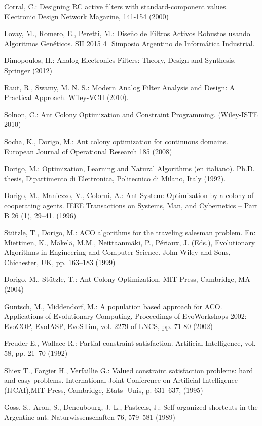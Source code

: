 \documentclass{llncs}
\begin{document}
  \begin{thebibliography}{1}
      Corral, C.: 
      Designing RC active filters with standard-component values. Electronic Design
      Network Magazine, 141-154 (2000)
      
      Lovay, M., Romero, E., Peretti, M.:
      Diseño de Filtros Activos Robustos usando Algoritmos Genéticos.
      SII 2015 4$^\circ$ Simposio Argentino de Informática Industrial.
      
      Dimopoulos, H.: 
      Analog Electronics Filters: Theory, Design and Synthesis. 
      Springer (2012)
      
      Raut, R., Swamy, M. N. S.: 
      Modern Analog Filter Analysis and Design: A Practical Approach. 
      Wiley-VCH (2010).
      
      Solnon, C.:
      Ant Colony Optimization and Constraint Programming. (Wiley-ISTE 2010) 
      
      Socha, K., Dorigo, M.:
      Ant colony optimization for continuous domains.
      European Journal of Operational Research 185 (2008)
      
      Dorigo, M.:
      Optimization, Learning and Natural Algorithms (en italiano). 
      Ph.D. thesis, Dipartimento di Elettronica, Politecnico di Milano, Italy (1992).
      
      Dorigo, M., Maniezzo, V., Colorni, A.: 
      Ant System: Optimization by a colony of cooperating agents. 
      IEEE Transactions on Systems, Man, and Cybernetics – Part B 26 (1), 29–41. (1996)
      
      Stützle, T., Dorigo, M.:
      ACO algorithms for the traveling salesman problem. 
      En: Miettinen, K., Mäkelä, M.M., Neittaanmäki, P., Périaux, J. (Eds.), Evolutionary Algorithms in
	  Engineering and Computer Science. John Wiley and Sons,
	  Chichester, UK, pp. 163–183 (1999)

	 Dorigo, M., Stützle, T.: 
	 Ant Colony Optimization. 
	 MIT Press, Cambridge, MA (2004)
	 
	 Guntsch, M., Middendorf, M.:
	 A population based approach for ACO.
	 Applications of Evolutionary Computing, Proceedings of EvoWorkshops 2002:
	 EvoCOP, EvoIASP, EvoSTim, vol. 2279 of LNCS, pp. 71-80 (2002)
      
	  Freuder E., Wallace R.: 
	  Partial constraint satisfaction.
	  Artificial Intelligence, vol. 58, pp. 21–70 (1992)
	  
	 Shiex T., Fargier H., Verfaillie G.:
	 Valued constraint satisfaction problems: hard and easy problems. 
	 International Joint Conference on Artificial Intelligence (IJCAI),MIT Press, Cambridge, Etats-
	 Unis, p. 631–637, (1995)
	
	 Goss, S., Aron, S., Deneubourg, J.-L., Pasteels, J.: 
	 Self-organized shortcuts in the Argentine ant. 
	 Naturwissenschaften 76, 579–581 (1989)
      
      
  \end{thebibliography}
\end{document}
